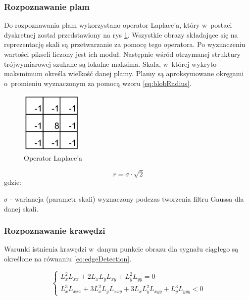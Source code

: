 \subsubsection{Rozpoznawanie plam}
\label{subsubsec:rozpoznawaniePlam}

Do rozpoznawania plam wykorzystano operator Laplace'a, który w~postaci dyskretnej został przedstawiony na rys \ref{fig:laplacian_kernel}. Wszystkie obrazy składające się na reprezentację skali są przetwarzanie za pomocę tego operatora. Po wyznaczeniu wartości pikseli liczony jest ich moduł. Następnie wśród otrzymanej struktury trójwymiarowej szukane są lokalne maksima. Skala, w~której wykryto maksmimum określa wielkość danej plamy. Plamy są aproksymowane okręgami o~promieniu wyznaczonym za pomocą wzoru \ref{eq:blobRadius}.

\begin{figure}
\begin{center}
\includegraphics[width=3cm]{laplacian.pdf}
\end{center}
\caption{Operator Laplace'a}
\label{fig:laplacian_kernel}
\end{figure}

\begin{equation}
\label{eq:blobRadius}
r = \sigma \cdot \sqrt{2}
\end{equation}
gdzie:

$ \sigma $ - wariancja (parametr skali) wyznaczony podczas tworzenia filtru Gaussa dla danej skali.

\subsubsection{Rozpoznawanie krawędzi}
\label{subsubsec:rozpoznawanieKrawedzi}

Warunki istnienia krawędzi w~danym punkcie obrazu dla sygnału ciągłego są określone na równaniu \ref{eq:edgeDetection}.

\begin{equation}
\label{eq:edgeDetection}
\left\{ \begin{array}{rl}
L_x^2 L_{xx} + 2L_xL_yL_{xy} + L_y^2L_{yy} = 0 \\
L_x^3L_{xxx} + 3L_x^2L_yL_{xxy} + 3L_xL_y^2L_{xyy} + L_y^3L_{yyy} < 0
\end{array} \right.
\end{equation}

